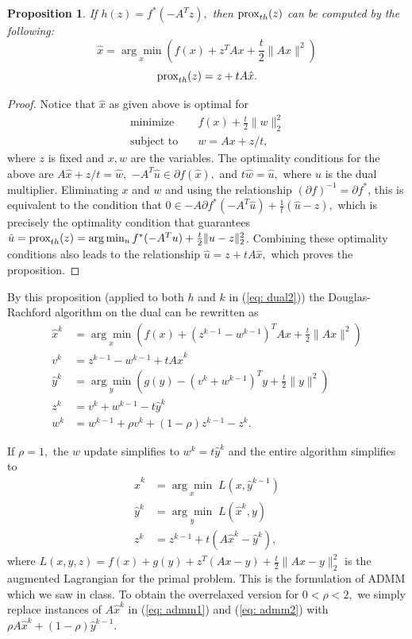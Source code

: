 \documentclass[12pt]{article}
\newtheorem{proposition}{Proposition}[section]
\begin{document}
\begin{proposition} If $h(z) = f^*(-A^Tz),$ then $\text{prox}_{th}(z)$ can be computed by the following:
\[ \hat{x} = \underset{x}{\arg \min} \left( f(x) + z^T Ax + \frac{t}{2} \|Ax \|^2 \right) \]
\[ \text{prox}_{th}(z) = z+ tA\hat{x}. \]
\end{proposition}

\begin{proof} 
Notice that $\hat{x}$ as given above is optimal for
\begin{align*}
 \text{minimize} \quad & f(x) + \frac{t}{2} \|w\|_2^2 \\
\text{subject to} \quad & w = Ax + z/t,
\end{align*}
where $z$ is fixed and $x,w$ are the variables. The optimality conditions for the above are $A\hat{x} + z/t = \hat{w},$ $-A^T\hat{u} \in \partial f(\hat{x}),$ and $t\hat{w}=\hat{u},$ where $u$ is the dual multiplier. Eliminating $x$ and $w$ and using the relationship $(\partial f)^{-1} = \partial f^*$, this is equivalent to the condition that $0 \in - A \partial f^*(-A^T \hat{u})+ \frac{1}{t}(\hat{u}-z) ,$ which is precisely the optimality condition that guarantees $\hat{u} = \text{prox}_{th}(z) = \arg \min _u f^*(-A^Tu) + \frac{t}{2} \|u-z\|_2^2$. Combining these optimality conditions also leads to the relationship $\hat{u} = z+tA\hat{x},$ which proves the proposition.
\end{proof}

By this proposition (applied to both $h$ and $k$ in (\ref{eq: dual2})) the Douglas-Rachford algorithm on the dual can be rewritten as
\begin{align*}
\hat{x}^k &= \underset{x}{\arg \min} \left( f(x) + (z^{k-1} - w^{k-1})^T Ax + \frac{t}{2} \|Ax \|^2 \right) \\
v^k &= z^{k-1} - w^{k-1} + tA \hat{x}^k \\
\hat{y}^k &= \underset{y}{\arg \min} \left( g(y) -(v^k + w^{k-1})^T y + \frac{t}{2} \|y \|^2 \right) \\
z^k &= v^k + w^{k-1} - t \hat{y}^k\\
w^k &= w^{k-1}+ \rho v^k + (1-\rho)z^{k-1} - z^k.
\end{align*}

If $\rho = 1,$ the $w$ update simplifies to $w^k = t\hat{y}^k$ and the entire algorithm simplifies to
\begin{align}
\hat{x}^k &= \underset{x}{\arg \min} \; L(x,\hat{y}^{k-1}) \\
\hat{y}^k &= \underset{y}{\arg \min} \; L(\hat{x}^k,y) \label{eq: admm1} \\
z^k &= z^{k-1} + t(A \hat{x}^k -\hat{y}^k),  \label{eq: admm2} 
\end{align}
where $L(x,y,z) = f(x) + g(y) + z^T(Ax-y) + \frac{t}{2} \|Ax-y\|_2^2$ is the augmented Lagrangian for the primal problem. This is the formulation of ADMM which we saw in class. To obtain the overrelaxed version for $0< \rho <2,$ we simply replace instances of $A \hat{x}^k$ in (\ref{eq: admm1}) and (\ref{eq: admm2}) with $\rho A \hat{x}^k + (1- \rho) \hat{y}^{k-1}.$
\end{document}
